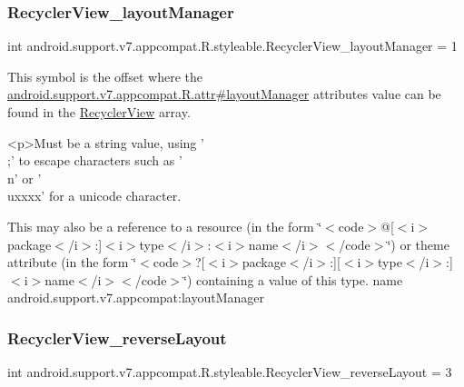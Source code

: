 \subsubsection{\texorpdfstring{Recycler\+View\+\_\+layout\+Manager}{RecyclerView\_layoutManager}}
{\footnotesize\ttfamily int android.\+support.\+v7.\+appcompat.\+R.\+styleable.\+Recycler\+View\+\_\+layout\+Manager = 1\hspace{0.3cm}{\ttfamily [static]}}

This symbol is the offset where the \hyperlink{classandroid_1_1support_1_1v7_1_1appcompat_1_1R_1_1attr_a6e635fa75682ab7dee989c2d98624c99}{android.\+support.\+v7.\+appcompat.\+R.\+attr\#layout\+Manager} attribute\textquotesingle{}s value can be found in the \hyperlink{classandroid_1_1support_1_1v7_1_1appcompat_1_1R_1_1styleable_ae3744efe286beea8d85d9fa344fa70df}{Recycler\+View} array.

\begin{DoxyVerb}      <p>Must be a string value, using '\\;' to escape characters such as '\\n' or '\\uxxxx' for a unicode character.
\end{DoxyVerb}
 

This may also be a reference to a resource (in the form \char`\"{}$<$code$>$@\mbox{[}$<$i$>$package$<$/i$>$\+:\mbox{]}$<$i$>$type$<$/i$>$\+:$<$i$>$name$<$/i$>$$<$/code$>$\char`\"{}) or theme attribute (in the form \char`\"{}$<$code$>$?\mbox{[}$<$i$>$package$<$/i$>$\+:\mbox{]}\mbox{[}$<$i$>$type$<$/i$>$\+:\mbox{]}$<$i$>$name$<$/i$>$$<$/code$>$\char`\"{}) containing a value of this type.  name android.\+support.\+v7.\+appcompat\+:layout\+Manager \mbox{\label{classandroid_1_1support_1_1v7_1_1appcompat_1_1R_1_1styleable_a27340547a2470f70de21cecee86cefb0}} 
\subsubsection{\texorpdfstring{Recycler\+View\+\_\+reverse\+Layout}{RecyclerView\_reverseLayout}}
{\footnotesize\ttfamily int android.\+support.\+v7.\+appcompat.\+R.\+styleable.\+Recycler\+View\+\_\+reverse\+Layout = 3\hspace{0.3cm}{\ttfamily [static]}}

